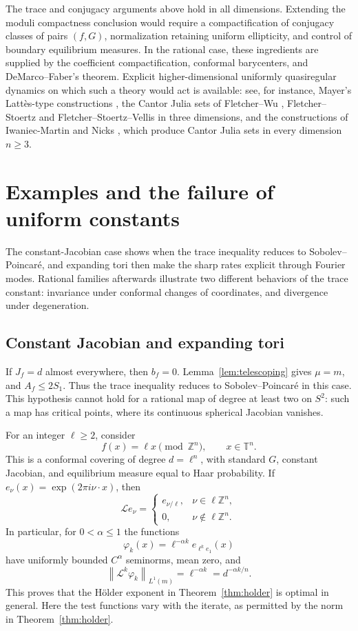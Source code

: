 \documentclass[11pt,reqno]{amsart}
\theoremstyle{plain}
\theoremstyle{definition}
\theoremstyle{remark}
\newcommand{\T}{\mathbb T}
\newcommand{\Lop}{\mathcal L}
\newcommand{\norm}[1]{\left\lVert #1\right\rVert}
\numberwithin{equation}{section}
\begin{document}
The trace and conjugacy arguments above hold in all dimensions. Extending the moduli compactness conclusion would require a compactification of conjugacy classes of pairs $(f,G)$, normalization retaining uniform ellipticity, and control of boundary equilibrium measures. In the rational case, these ingredients are supplied by the coefficient compactification, conformal barycenters, and DeMarco--Faber's theorem. Explicit higher-dimensional uniformly quasiregular dynamics on which such a theory would act is available: see, for instance, Mayer's Latt\`es-type constructions \cite{May97}, the Cantor Julia sets of Fletcher--Wu \cite{FW15}, Fletcher--Stoertz \cite{FS22} and Fletcher--Stoertz--Vellis \cite{FSV} in three dimensions, and the constructions of Iwaniec-Martin \cite{IM96} and Nicks \cite{Nic26}, which produce Cantor Julia sets in every dimension $n\ge3$.

\section{Examples and the failure of uniform constants}\label{sec:examples}

The constant-Jacobian case shows when the trace inequality reduces to Sobolev--Poincar\'e, and expanding tori then make the sharp rates explicit through Fourier modes. Rational families afterwards illustrate two different behaviors of the trace constant: invariance under conformal changes of coordinates, and divergence under degeneration.

\subsection{Constant Jacobian and expanding tori}\label{subsec:tori}

If $J_f=d$ almost everywhere, then $b_f=0$. Lemma~\ref{lem:telescoping} gives $\mu=m$, and $A_f\le2S_1$. Thus the trace inequality reduces to Sobolev--Poincar\'e in this case. This hypothesis cannot hold for a rational map of degree at least two on $S^2$: such a map has critical points, where its continuous spherical Jacobian vanishes.

For an integer $\ell\ge2$, consider
\[
 f(x)=\ell x\pmod{\mathbb Z^n},\qquad x\in\T^n.
\]
This is a conformal covering of degree $d=\ell^n$, with standard $G$, constant Jacobian, and equilibrium measure equal to Haar probability. If $e_\nu(x)=\exp(2\pi i\nu\cdot x)$, then
\[
 \Lop e_\nu=
 \begin{cases}
 e_{\nu/\ell},&\nu\in\ell\mathbb Z^n,\\
 0,&\nu\notin\ell\mathbb Z^n.
 \end{cases}
\]
In particular, for $0<\alpha\le1$ the functions
\[
 \varphi_k(x)=\ell^{-\alpha k}e_{\ell^k e_1}(x)
\]
have uniformly bounded $C^\alpha$ seminorms, mean zero, and
\[
 \norm{\Lop^k\varphi_k}_{L^1(m)}
 =\ell^{-\alpha k}=d^{-\alpha k/n}.
\]
This proves that the H\"older exponent in Theorem~\ref{thm:holder} is optimal in general. Here the test functions vary with the iterate, as permitted by the norm in Theorem~\ref{thm:holder}.
\end{document}
